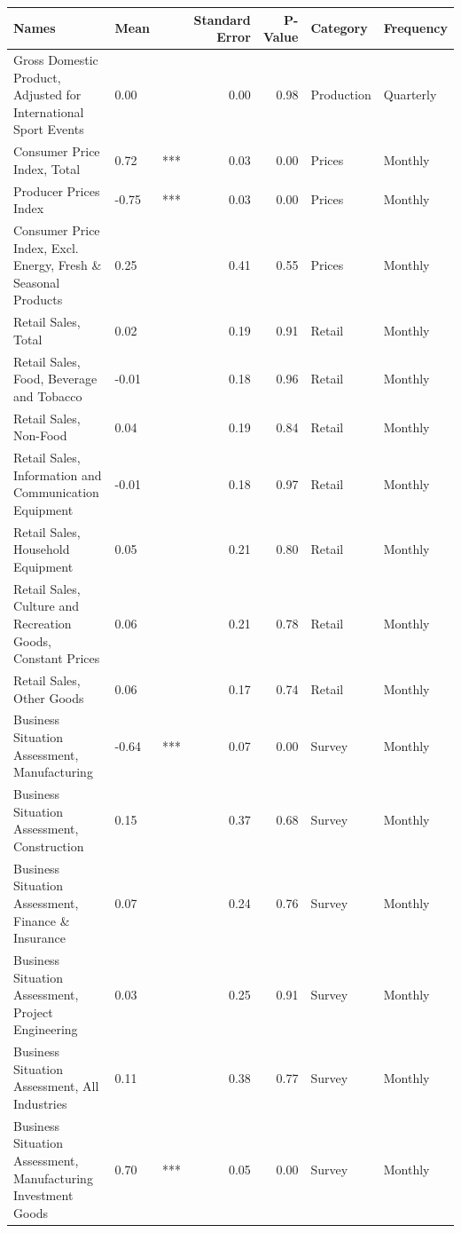 \begin{table}[ht]
\centering
\begin{tabular}{lllrrll}
  \hline
Names & Mean &  & Standard Error & P-Value & Category & Frequency \\ 
  \hline
Gross Domestic Product, Adjusted for International Sport Events &  0.00 &  & 0.00 & 0.98 & Production & Quarterly \\ 
  Consumer Price Index, Total &  0.72 & *** & 0.03 & 0.00 & Prices & Monthly \\ 
  Producer Prices Index & -0.75 & *** & 0.03 & 0.00 & Prices & Monthly \\ 
  Consumer Price Index, Excl. Energy, Fresh \& Seasonal Products &  0.25 &  & 0.41 & 0.55 & Prices & Monthly \\ 
  Retail Sales, Total &  0.02 &  & 0.19 & 0.91 & Retail & Monthly \\ 
  Retail Sales, Food, Beverage and Tobacco & -0.01 &  & 0.18 & 0.96 & Retail & Monthly \\ 
  Retail Sales, Non-Food &  0.04 &  & 0.19 & 0.84 & Retail & Monthly \\ 
  Retail Sales, Information and Communication Equipment & -0.01 &  & 0.18 & 0.97 & Retail & Monthly \\ 
  Retail Sales, Household Equipment &  0.05 &  & 0.21 & 0.80 & Retail & Monthly \\ 
  Retail Sales, Culture and Recreation Goods, Constant Prices &  0.06 &  & 0.21 & 0.78 & Retail & Monthly \\ 
  Retail Sales, Other Goods &  0.06 &  & 0.17 & 0.74 & Retail & Monthly \\ 
  Business Situation Assessment, Manufacturing & -0.64 & *** & 0.07 & 0.00 & Survey & Monthly \\ 
  Business Situation Assessment, Construction &  0.15 &  & 0.37 & 0.68 & Survey & Monthly \\ 
  Business Situation Assessment, Finance \& Insurance &  0.07 &  & 0.24 & 0.76 & Survey & Monthly \\ 
  Business Situation Assessment, Project Engineering &  0.03 &  & 0.25 & 0.91 & Survey & Monthly \\ 
  Business Situation Assessment, All Industries &  0.11 &  & 0.38 & 0.77 & Survey & Monthly \\ 
  Business Situation Assessment, Manufacturing Investment Goods  &  0.70 & *** & 0.05 & 0.00 & Survey & Monthly \\ 

\end{tabular}
\end{table}
